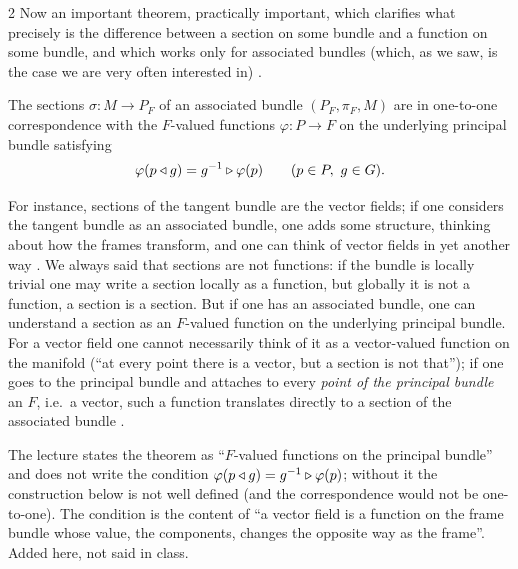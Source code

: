 \begin{paracol}{2}
Now an important theorem, practically important, which clarifies what precisely is the difference between a section on some bundle and a function on some bundle, and which works only for associated bundles (which, as we saw, is the case we are very often interested in)  .
\begin{theorem}\label{thm:ab-sections}
The sections $\sigma\colon M\to P_F$ of an associated bundle $(P_F,\pi_F,M)$ are in one-to-one correspondence with the $F$-valued functions $\varphi\colon P\to F$ on the underlying principal bundle satisfying
\[
  \varphi(p\mathbin{\triangleleft} g)=g^{-1}\mathbin{\triangleright}\varphi(p)\qquad(p\in P,\ g\in G).
\]
       
\end{theorem}
For instance, sections of the tangent bundle are the vector fields; if one considers the tangent bundle as an associated bundle, one adds some structure, thinking about how the frames transform, and one can think of vector fields in yet another way  . We always said that sections are not functions: if the bundle is locally trivial one may write a section locally as a function, but globally it is not a function, a section is a section. But if one has an associated bundle, one can understand a section as an $F$-valued function on the underlying principal bundle. For a vector field one cannot necessarily think of it as a vector-valued function on the manifold (``at every point there is a vector, but a section is not that''); if one goes to the principal bundle and attaches to every \emph{point of the principal bundle} an $F$, i.e.\ a vector, such a function translates directly to a section of the associated bundle      .
\begin{coursenote}
The lecture states the theorem as ``$F$-valued functions on the principal bundle'' and does not write the condition $\varphi(p\mathbin{\triangleleft} g)=g^{-1}\mathbin{\triangleright}\varphi(p)$; without it the construction below is not well defined (and the correspondence would not be one-to-one). The condition is the content of ``a vector field is a function on the frame bundle whose value, the components, changes the opposite way as the frame''. Added here, not said in class. 
\end{coursenote}

\end{paracol}
